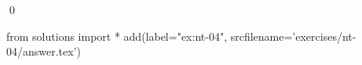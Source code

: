 
\begin{ex} 
  \label{ex:nt-04}
  
  \qed
\end{ex} 
\begin{python0}
from solutions import *
add(label="ex:nt-04",
    srcfilename='exercises/nt-04/answer.tex') 
\end{python0}
